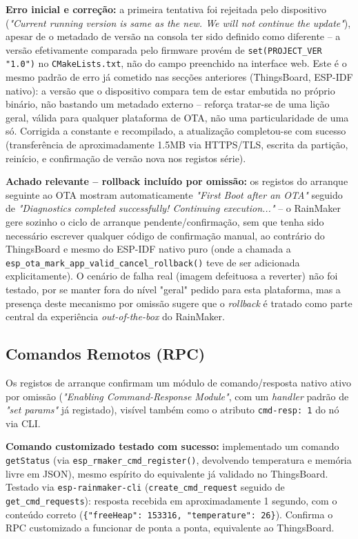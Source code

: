 \documentclass[a4paper,12pt]{article}
\begin{document}
\textbf{Erro inicial e correção:} a primeira tentativa foi rejeitada pelo dispositivo (\textit{"Current running version is same as the new. We will not continue the update"}), apesar de o metadado de versão na consola ter sido definido como diferente -- a versão efetivamente comparada pelo firmware provém de \texttt{set(PROJECT\_VER "1.0")} no \texttt{CMakeLists.txt}, não do campo preenchido na interface web. Este é o mesmo padrão de erro já cometido nas secções anteriores (ThingsBoard, ESP-IDF nativo): a versão que o dispositivo compara tem de estar embutida no próprio binário, não bastando um metadado externo -- reforça tratar-se de uma lição geral, válida para qualquer plataforma de OTA, não uma particularidade de uma só. Corrigida a constante e recompilado, a atualização completou-se com sucesso (transferência de aproximadamente 1.5MB via HTTPS/TLS, escrita da partição, reinício, e confirmação de versão nova nos registos série).

\textbf{Achado relevante -- rollback incluído por omissão:} os registos do arranque seguinte ao OTA mostram automaticamente \textit{"First Boot after an OTA"} seguido de \textit{"Diagnostics completed successfully! Continuing execution..."} -- o RainMaker gere sozinho o ciclo de arranque pendente/confirmação, sem que tenha sido necessário escrever qualquer código de confirmação manual, ao contrário do ThingsBoard e mesmo do ESP-IDF nativo puro (onde a chamada a \texttt{esp\_ota\_mark\_app\_valid\_cancel\_rollback()} teve de ser adicionada explicitamente). O cenário de falha real (imagem defeituosa a reverter) não foi testado, por se manter fora do nível "geral" pedido para esta plataforma, mas a presença deste mecanismo por omissão sugere que o \textit{rollback} é tratado como parte central da experiência \textit{out-of-the-box} do RainMaker.

\subsection{Comandos Remotos (RPC)}
Os registos de arranque confirmam um módulo de comando/resposta nativo ativo por omissão (\textit{"Enabling Command-Response Module"}, com um \textit{handler} padrão de \textit{"set params"} já registado), visível também como o atributo \texttt{cmd-resp: 1} do nó via CLI.

\textbf{Comando customizado testado com sucesso:} implementado um comando \texttt{getStatus} (via \texttt{esp\_rmaker\_cmd\_register()}, devolvendo temperatura e memória livre em JSON), mesmo espírito do equivalente já validado no ThingsBoard. Testado via \texttt{esp-rainmaker-cli} (\texttt{create\_cmd\_request} seguido de \texttt{get\_cmd\_requests}): resposta recebida em aproximadamente 1 segundo, com o conteúdo correto (\texttt{\{"freeHeap": 153316, "temperature": 26\}}). Confirma o RPC customizado a funcionar de ponta a ponta, equivalente ao ThingsBoard.
\end{document}
